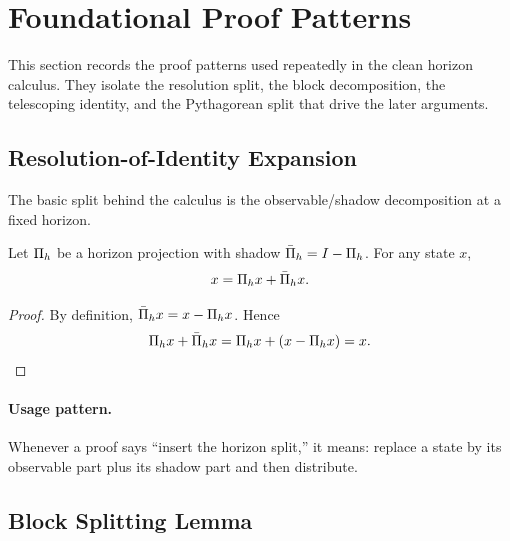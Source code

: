 \section{Foundational Proof Patterns}
\label{sec:foundational-lemmas}

This section records the proof patterns used repeatedly in the clean horizon calculus.
They isolate the resolution split, the block decomposition, the telescoping identity, and the Pythagorean split that drive the later arguments.

\subsection{Resolution-of-Identity Expansion}
\label{subsec:resolution-lemma}

The basic split behind the calculus is the observable/shadow decomposition at a fixed horizon.

\begin{lemma}
\label{lem:resolution-identity}
Let $\Pi_{h}$ be a horizon projection with shadow $\bar{\Pi}_{h} = I - \Pi_{h}$.
For any state $x$,
\[
x = \Pi_{h}x + \bar{\Pi}_{h}x.
\]
\end{lemma}

\begin{proof}
By definition, $\bar{\Pi}_{h}x = x - \Pi_{h}x$.
Hence
\[
\Pi_{h}x + \bar{\Pi}_{h}x = \Pi_{h}x + (x - \Pi_{h}x) = x.
\]
\end{proof}

\paragraph{Usage pattern.}
Whenever a proof says ``insert the horizon split,'' it means: replace a state
by its observable part plus its shadow part and then distribute.

\subsection{Block Splitting Lemma}
\label{subsec:block-splitting}

